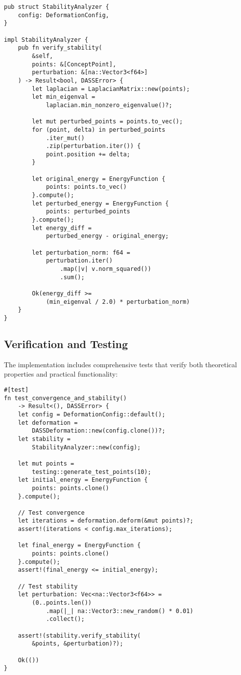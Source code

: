 \documentclass{article}
\begin{document}
\begin{verbatim}
pub struct StabilityAnalyzer {
    config: DeformationConfig,
}

impl StabilityAnalyzer {
    pub fn verify_stability(
        &self,
        points: &[ConceptPoint],
        perturbation: &[na::Vector3<f64>]
    ) -> Result<bool, DASSError> {
        let laplacian = LaplacianMatrix::new(points);
        let min_eigenval = 
            laplacian.min_nonzero_eigenvalue()?;
        
        let mut perturbed_points = points.to_vec();
        for (point, delta) in perturbed_points
            .iter_mut()
            .zip(perturbation.iter()) {
            point.position += delta;
        }
        
        let original_energy = EnergyFunction { 
            points: points.to_vec() 
        }.compute();
        let perturbed_energy = EnergyFunction { 
            points: perturbed_points 
        }.compute();
        let energy_diff = 
            perturbed_energy - original_energy;
        
        let perturbation_norm: f64 = 
            perturbation.iter()
                .map(|v| v.norm_squared())
                .sum();
            
        Ok(energy_diff >= 
            (min_eigenval / 2.0) * perturbation_norm)
    }
}
\end{verbatim}

\subsection{Verification and Testing}
The implementation includes comprehensive tests that verify both theoretical properties and practical functionality:

\begin{verbatim}
#[test]
fn test_convergence_and_stability() 
    -> Result<(), DASSError> {
    let config = DeformationConfig::default();
    let deformation = 
        DASSDeformation::new(config.clone())?;
    let stability = 
        StabilityAnalyzer::new(config);
    
    let mut points = 
        testing::generate_test_points(10);
    let initial_energy = EnergyFunction { 
        points: points.clone() 
    }.compute();
    
    // Test convergence
    let iterations = deformation.deform(&mut points)?;
    assert!(iterations < config.max_iterations);
    
    let final_energy = EnergyFunction { 
        points: points.clone() 
    }.compute();
    assert!(final_energy <= initial_energy);
    
    // Test stability
    let perturbation: Vec<na::Vector3<f64>> = 
        (0..points.len())
            .map(|_| na::Vector3::new_random() * 0.01)
            .collect();
            
    assert!(stability.verify_stability(
        &points, &perturbation)?);
    
    Ok(())
}
\end{verbatim}
\end{document}
